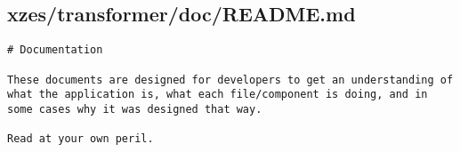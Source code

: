 \subsection{xzes/transformer/doc/README.md}
\begin{lstlisting}
# Documentation

These documents are designed for developers to get an understanding of what the application is, what each file/component is doing, and in some cases why it was designed that way.

Read at your own peril.
\end{lstlisting}

